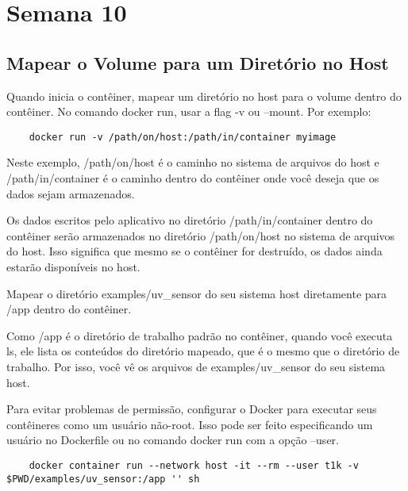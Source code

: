 \section{Semana 10}


\subsection{Mapear o Volume para um Diretório no Host}

Quando inicia o contêiner, mapear um diretório no host para o volume dentro do contêiner. No comando docker run, usar a flag -v ou --mount. Por exemplo:

\begin{verbatim}
    docker run -v /path/on/host:/path/in/container myimage
\end{verbatim}

Neste exemplo, /path/on/host é o caminho no sistema de arquivos do host e /path/in/container é o caminho dentro do contêiner onde você deseja que os dados sejam armazenados.

Os dados escritos pelo aplicativo no diretório /path/in/container dentro do contêiner serão armazenados no diretório /path/on/host no sistema de arquivos do host. Isso significa que mesmo se o contêiner for destruído, os dados ainda estarão disponíveis no host.

Mapear o diretório examples/uv_sensor do seu sistema host diretamente para /app dentro do contêiner.


Como /app é o diretório de trabalho padrão no contêiner, quando você executa ls, ele lista os conteúdos do diretório mapeado, que é o mesmo que o diretório de trabalho. Por isso, você vê os arquivos de examples/uv_sensor do seu sistema host.

Para evitar problemas de permissão,  configurar o Docker para executar seus contêineres como um usuário não-root. Isso pode ser feito especificando um usuário no Dockerfile ou no comando docker run com a opção --user.

\begin{verbatim}
    docker container run --network host -it --rm --user t1k -v $PWD/examples/uv_sensor:/app '' sh
\end{verbatim}
